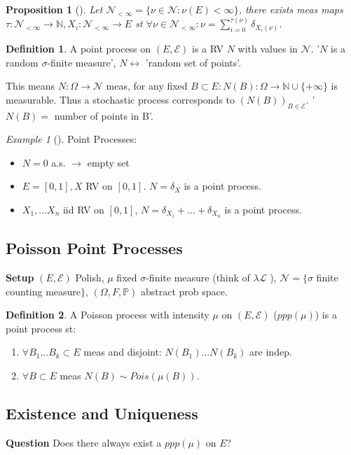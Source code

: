 \documentclass[12pt]{book}
\newtheorem{prop}[theorem]{Proposition}
\theoremstyle{definition}
\newtheorem{defn}{Definition}[section]
\theoremstyle{remark}
\newtheorem{ex}{Example}[section]
\begin{document}
\begin{prop}[]
	Let $\mathcal{N}_{<\infty}=\{\nu \in \mathcal{N}: \nu(E)<\infty \}$, there exists meas maps $\tau: \mathcal{N}_{< \infty} \to \mathbb{N}, X_i: \mathcal{N}_{< \infty} \to E$ st $\forall \nu \in \mathcal{N}_{<\infty}: \nu = \sum_{i=0}^{\tau(\nu)} \delta_{X_i(\nu)}$.
\end{prop}

\begin{defn}
	A point process on $(E, \mathcal{E})$ is a RV $N$ with values in $ \mathcal{N}$. '$N$ is a random $\sigma$-finite measure', $N \leftrightarrow$ 'random set of points'. 
\end{defn}
This means $N: \Omega \to \mathcal{N} $ meas, for any fixed $B \subset E: N(B): \Omega \to \mathbb{N}\cup \{+\infty\}$ is measurable. 
Thus a stochastic process corresponds to $(N(B))_{B \in \mathcal{E}}$. '$N(B)=$ number of points in B'.

\begin{ex}[] Point Processes:
\begin{itemize}
	\item $N=0$ a.s.  $\to$ empty set
	\item $E=[0,1], X$ RV on  $[0,1]$.  $N=\delta_X$ is a point process.
	\item $X_1,...X_n$ iid RV on $[0,1]$,  $N=\delta_{X_1}+...+\delta_{X_n}$ is a point process.
\end{itemize}
\end{ex}

\subsection{Poisson Point Processes}
\textbf{Setup} $(E, \mathcal{E})$ Polish, $\mu$ fixed $\sigma$-finite measure (think of $\lambda \mathcal{L}$ ), $ \mathcal{N}=\{\sigma$ finite counting measure$\}$, $(\Omega, F, \mathbb{P} )$ abstract prob space.

\begin{defn}
	A Poisson process with intensity $\mu$ on $(E, \mathcal{E})$ ($ppp(\mu)$) is a point process st:
 \begin{enumerate}
	 \item $\forall B_1...B_k \subset E$ meas and disjoint: $N(B_1)...N(B_k)$ are indep.
	 \item $\forall B \subset E$ meas $N(B) \sim Pois(\mu(B))$.
\end{enumerate}
\end{defn}

\subsection{Existence and Uniqueness}
\textbf{Question} Does there always exist a $ppp(\mu)$ on $E$?
\end{document}
